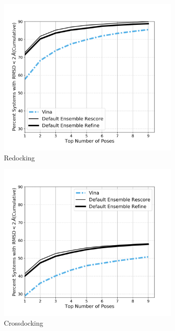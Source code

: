 \documentclass[journal=jcisd8,manuscript=article]{achemso}
\begin{document}
\begin{figure}    
        \begin{subfigure}[b]{0.48\textwidth}    
		\centering
		\includegraphics[width=\textwidth]{figures/redocking/rescore_vs_refine_line.png} 
		\caption{Redocking}
		\label{fig:ref vs resc rd}
        \end{subfigure}    
        \begin{subfigure}[b]{0.48\textwidth}    
		\centering
		\includegraphics[width=\textwidth]{figures/crossdocking/rescore_vs_refine_line.png} 
		\caption{Crossdocking}
		\label{fig:ref vs resc cd}
        \end{subfigure}    
	\caption{}
	\label{fig:rescore refine comparison}
\end{figure}    
\end{document}
